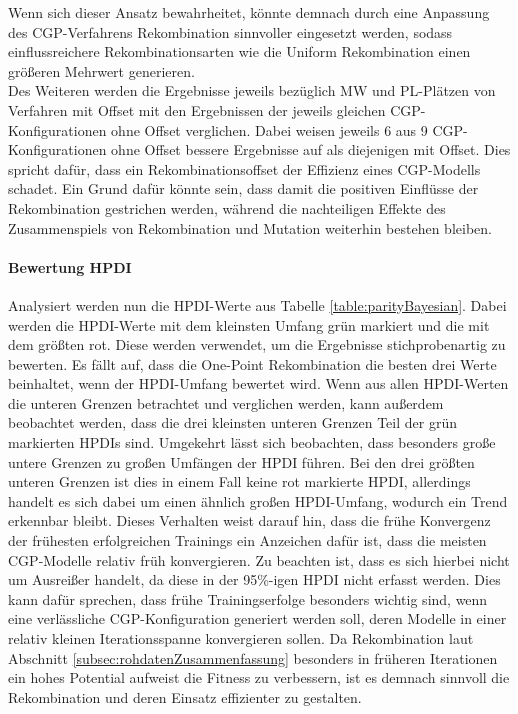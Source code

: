 Wenn sich dieser Ansatz bewahrheitet, könnte demnach durch eine Anpassung des CGP-Verfahrens Rekombination sinnvoller eingesetzt werden, sodass einflussreichere Rekombinationsarten wie die Uniform Rekombination einen größeren Mehrwert generieren.\\
Des Weiteren werden die Ergebnisse jeweils bezüglich MW und PL-Plätzen von Verfahren mit Offset mit den Ergebnissen der jeweils gleichen CGP-Konfigurationen ohne Offset verglichen.
Dabei weisen jeweils 6 aus 9 CGP-Konfigurationen ohne Offset bessere Ergebnisse auf als diejenigen mit Offset.
Dies spricht dafür, dass ein Rekombinationsoffset der Effizienz eines CGP-Modells schadet.
Ein Grund dafür könnte sein, dass damit die positiven Einflüsse der Rekombination gestrichen werden, während die nachteiligen Effekte des Zusammenspiels von Rekombination und Mutation weiterhin bestehen bleiben.
\paragraph{Bewertung HPDI}
Analysiert werden nun die HPDI-Werte aus Tabelle \ref{table:parityBayesian}.
Dabei werden die HPDI-Werte mit dem kleinsten Umfang grün markiert und die mit dem größten rot.
Diese werden verwendet, um die Ergebnisse stichprobenartig zu bewerten.
Es fällt auf, dass die One-Point Rekombination die besten drei Werte beinhaltet, wenn der HPDI-Umfang bewertet wird.
Wenn aus allen HPDI-Werten die unteren Grenzen betrachtet und verglichen werden, kann außerdem beobachtet werden, dass die drei kleinsten unteren Grenzen Teil der grün markierten HPDIs sind.
Umgekehrt lässt sich beobachten, dass besonders große untere Grenzen zu großen Umfängen der HPDI führen.
Bei den drei größten unteren Grenzen ist dies in einem Fall keine rot markierte HPDI, allerdings handelt es sich dabei um einen ähnlich großen HPDI-Umfang, wodurch ein Trend erkennbar bleibt.
Dieses Verhalten weist darauf hin, dass die frühe Konvergenz der frühesten erfolgreichen Trainings ein Anzeichen dafür ist, dass die meisten CGP-Modelle relativ früh konvergieren.
Zu beachten ist, dass es sich hierbei nicht um Ausreißer handelt, da diese in der 95\%-igen HPDI nicht erfasst werden.
Dies kann dafür sprechen, dass frühe Trainingserfolge besonders wichtig sind, wenn eine verlässliche CGP-Konfiguration generiert werden soll, deren Modelle in einer relativ kleinen Iterationsspanne konvergieren sollen.
Da Rekombination laut Abschnitt \ref{subsec:rohdatenZusammenfassung} besonders in früheren Iterationen ein hohes Potential aufweist die Fitness zu verbessern, ist es demnach sinnvoll die Rekombination und deren Einsatz effizienter zu gestalten.

